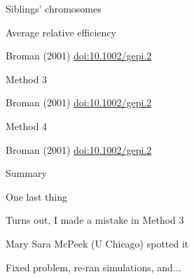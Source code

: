 \documentclass[aspectratio=169,12pt,t]{beamer}
\begin{document}
\begin{frame}{Siblings' chromosomes}

\note{
}

\end{frame}





\begin{frame}{Average relative efficiency}

\vspace{10mm}

\hfill \footnotesize {\lolit Broman (2001)
  \href{https://doi.org/10.1002/gepi.2}{doi:10.1002/gepi.2}}


\note{
}

\end{frame}

\begin{frame}{Method 3}

\vspace{18mm}

\hfill \footnotesize {\lolit Broman (2001)
  \href{https://doi.org/10.1002/gepi.2}{doi:10.1002/gepi.2}}


\note{
}

\end{frame}

\begin{frame}{Method 4}

\bigskip

\hfill \footnotesize {\lolit Broman (2001)
  \href{https://doi.org/10.1002/gepi.2}{doi:10.1002/gepi.2}}


\note{
}

\end{frame}


\begin{frame}[c]{Summary}

\note{
}

\end{frame}


\begin{frame}{One last thing}

  \bbi
\item Turns out, I made a {\hilit mistake} in Method 3
  \bi
\item[]  Mary Sara McPeek (U Chicago) spotted it
  \ei
\item Fixed problem, re-ran simulations, and... \\[18pt]
 \ei


\note{
}

\end{frame}
\end{document}
